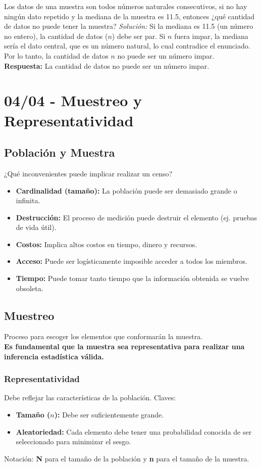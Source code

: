 \documentclass[12pt, letterpaper]{article}
\begin{document}
\vspace{1em}
\noindent Los datos de una muestra son todos números naturales consecutivos, si no hay ningún dato repetido y la mediana de la muestra es 11.5, entonces ¿qué cantidad de datos no puede tener la muestra?
\textit{Solución:}
Si la mediana es 11.5 (un número no entero), la cantidad de datos ($n$) debe ser par. Si $n$ fuera impar, la mediana sería el dato central, que es un número natural, lo cual contradice el enunciado.
Por lo tanto, la cantidad de datos $n$ no puede ser un número impar. \\
\textbf{Respuesta:} La cantidad de datos no puede ser un número impar.
\newpage

\section{04/04 - Muestreo y Representatividad}
\subsection{Población y Muestra}
¿Qué inconvenientes puede implicar realizar un censo?
\begin{itemize}
    \item \textbf{Cardinalidad (tamaño):} La población puede ser demasiado grande o infinita.
    \item \textbf{Destrucción:} El proceso de medición puede destruir el elemento (ej. pruebas de vida útil).
    \item \textbf{Costos:} Implica altos costos en tiempo, dinero y recursos.
    \item \textbf{Acceso:} Puede ser logísticamente imposible acceder a todos los miembros.
    \item \textbf{Tiempo:} Puede tomar tanto tiempo que la información obtenida se vuelve obsoleta.
\end{itemize}

\subsection{Muestreo}
Proceso para escoger los elementos que conformarán la muestra. \\
\textbf{Es fundamental que la muestra sea representativa para realizar una inferencia estadística válida.}

\subsubsection{Representatividad}
Debe reflejar las características de la población. Claves:
\begin{itemize}
    \item \textbf{Tamaño ($n$):} Debe ser suficientemente grande.
    \item \textbf{Aleatoriedad:} Cada elemento debe tener una probabilidad conocida de ser seleccionado para minimizar el sesgo.
\end{itemize}
Notación: \textbf{N} para el tamaño de la población y \textbf{n} para el tamaño de la muestra.
\end{document}
